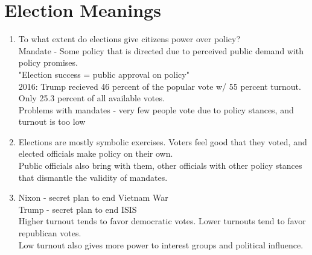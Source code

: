 \documentclass{article}
\begin{document}
\section{Election Meanings}
\begin{enumerate}
  \item {
  To what extent do elections give citizens power over policy?\\
  Mandate - Some policy that is directed due to perceived public demand with policy promises.\\
  "Election success = public approval on policy"\\
  2016: Trump recieved 46 percent of the popular vote w/ 55 percent turnout. Only 25.3 percent of all available votes.\\
  Problems with mandates - very few people vote due to policy stances, and turnout is too low
  }
  \item {
  Elections are mostly symbolic exercises. Voters feel good that they voted, and elected officials make policy on their own.\\
  Public officials also bring with them, other officials with other policy stances that dismantle the validity of mandates.
  }
  \item {
  Nixon - secret plan to end Vietnam War\\
  Trump - secret plan to end ISIS\\

  Higher turnout tends to favor democratic votes. Lower turnouts tend to favor republican votes.\\
  Low turnout also gives more power to interest groups and political influence.
  }
\end{enumerate}
\end{document}
